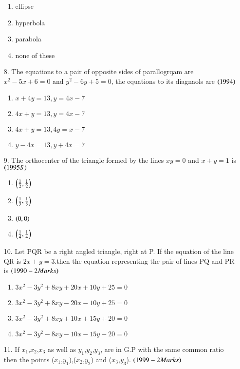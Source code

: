 \documentclass[journal,12pt,onecolumn]{IEEEtran}
\theoremstyle{remark}
\begin{document}
\begin{enumerate}
\begin{enumerate}
       \item ellipse
       \item hyperbola
       \item parabola
       \item none of these
    
\end{enumerate}
\item[8.] The equations to a pair of opposite sides of parallogrqam are $x^2-5x+6=0$ and $y^2-6y+5=0$, the equations to its diagnaols are 
\hfill{$\left(1994\right)$}
\begin{enumerate}
    
      \item $x+4y=13,y=4x-7$
    \item $4x+y=13,y=4x-7$
      \item $4x+y=13,4y=x-7$
        \item $y-4x=13,y+4x=7$
    
\end{enumerate}
\item[9.] The orthocenter of the triangle formed by the lines $xy=0$ and $x+y=1$ is 
\hfill{$\left(1995S\right)$}
\begin{enumerate}
    
      \item $\left(\frac{1}{2},\frac{1}{2}\right)$
      \item $\left(\frac{1}{3},\frac{1}{3}\right)$
      \item $\left(0,0\right)$
      \item $\left(\frac{1}{4},\frac{1}{4}\right)$
    
\end{enumerate}
\item[10.] Let PQR be a right angled triangle, right at P. If the equation of the line QR is $2x+y=3$.then the equation representing the pair of lines PQ and PR is
\hfill{$\left(1990-2 Marks\right)$}
\begin{enumerate}
    \item $3x^2-3y^2+8xy+20x+10y+25=0$
    \item $3x^2-3y^2+8xy-20x-10y+25=0$
    \item $3x^2-3y^2+8xy+10x+15y+20=0$
    \item $3x^2-3y^2-8xy-10x-15y-20=0$
\end{enumerate}
\item[11.] If $x_1$,$x_2$,$x_3$ as well as $y_1$,$y_2$,$y_3$, are in G.P with the same common ratio then the points ($x_1$,$y_1$),($x_2$,$y_2$) and ($x_3$,$y_3$).
\hfill{$\left(1999-2 Marks\right)$}
\begin{enumerate}
    

\end{enumerate}
\end{enumerate}
\end{document}
